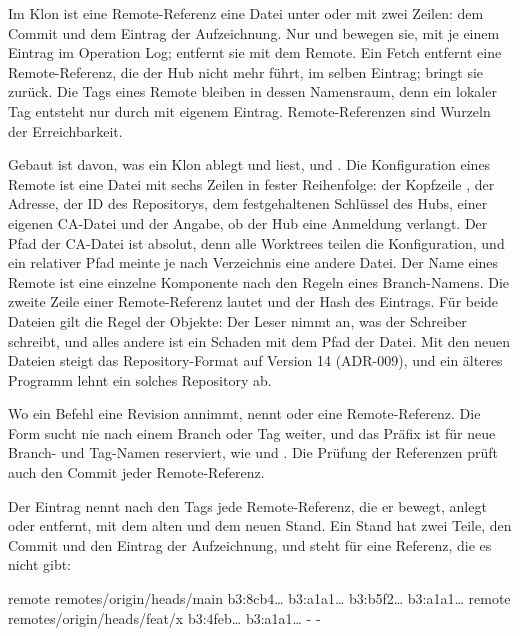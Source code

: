 Im Klon ist eine Remote-Referenz eine Datei unter  oder
 mit zwei Zeilen: dem Commit und dem Eintrag der Aufzeichnung.
Nur  und  bewegen sie, mit je einem Eintrag im Operation Log;
 entfernt sie mit dem Remote.
Ein Fetch entfernt eine Remote-Referenz, die der Hub nicht mehr führt, im selben Eintrag;
 bringt sie zurück.
Die Tags eines Remote bleiben in dessen Namensraum, denn ein lokaler Tag entsteht nur durch
 mit eigenem Eintrag.
Remote-Referenzen sind Wurzeln der Erreichbarkeit.

Gebaut ist davon, was ein Klon ablegt und liest,  und .
Die Konfiguration eines Remote ist eine Datei  mit sechs Zeilen in
fester Reihenfolge: der Kopfzeile , der Adresse, der ID des Repositorys,
dem festgehaltenen Schlüssel des Hubs, einer eigenen CA-Datei und der Angabe, ob der Hub
eine Anmeldung verlangt.
Der Pfad der CA-Datei ist absolut, denn alle Worktrees teilen die Konfiguration,
und ein relativer Pfad meinte je nach Verzeichnis eine andere Datei.
Der Name eines Remote ist eine einzelne Komponente nach den Regeln eines Branch-Namens.
Die zweite Zeile einer Remote-Referenz lautet  und der Hash des Eintrags.
Für beide Dateien gilt die Regel der Objekte: Der Leser nimmt an, was der Schreiber schreibt,
und alles andere ist ein Schaden mit dem Pfad der Datei.
Mit den neuen Dateien steigt das Repository-Format auf Version 14 (ADR-009), und ein älteres
Programm lehnt ein solches Repository ab.

Wo ein Befehl eine Revision annimmt, nennt  oder
 eine Remote-Referenz.
Die Form sucht nie nach einem Branch oder Tag weiter, und das Präfix  ist für neue
Branch- und Tag-Namen reserviert, wie  und .
Die Prüfung der Referenzen prüft auch den Commit jeder Remote-Referenz.

Der Eintrag  nennt nach den Tags jede Remote-Referenz, die er bewegt, anlegt oder
entfernt, mit dem alten und dem neuen Stand.
Ein Stand hat zwei Teile, den Commit und den Eintrag der Aufzeichnung, und \type{- -} steht für
eine Referenz, die es nicht gibt:

\starttyping
remote remotes/origin/heads/main b3:8cb4… b3:a1a1… b3:b5f2… b3:a1a1…
remote remotes/origin/heads/feat/x b3:4feb… b3:a1a1… - -
\stoptyping

